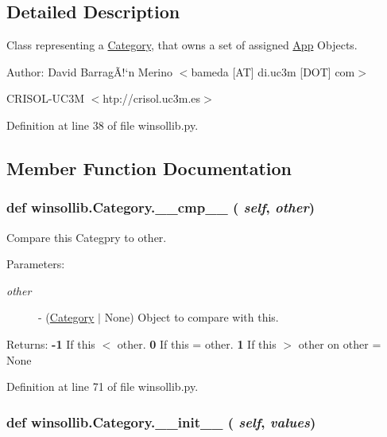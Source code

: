 \subsection{Detailed Description}
Class representing a \hyperlink{classwinsollib_1_1Category}{Category}, that owns a set of assigned \hyperlink{classwinsollib_1_1App}{App} Objects. 

\begin{Desc}
\item[Author:]David Barrag\~{A}!`n Merino $<$bameda \mbox{[}AT\mbox{]} di.uc3m \mbox{[}DOT\mbox{]} com$>$ 

CRISOL-UC3M $<$htp://crisol.uc3m.es$>$ \end{Desc}




Definition at line 38 of file winsollib.py.

\subsection{Member Function Documentation}
\hypertarget{classwinsollib_1_1Category_6f1f13764c35d89518361b6f9fb951d5}{
\subsubsection[\_\-\_\-cmp\_\-\_\-]{\setlength{\rightskip}{0pt plus 5cm}def winsollib.Category.\_\-\_\-cmp\_\-\_\- ( {\em self},  {\em other})}}
\label{classwinsollib_1_1Category_6f1f13764c35d89518361b6f9fb951d5}


Compare this Categpry to other. 

\begin{Desc}
\item[Parameters:]
\begin{description}
\item[{\em other}]- (\hyperlink{classwinsollib_1_1Category}{Category} $|$ None) Object to compare with this. \end{description}
\end{Desc}
\begin{Desc}
\item[Returns:]{\bf -1} If this $<$ other. {\bf 0} If this = other. {\bf 1} If this $>$ other on other = None \end{Desc}


Definition at line 71 of file winsollib.py.\hypertarget{classwinsollib_1_1Category_daae86f216d79ec0328c01945a0a18d6}{
\subsubsection[\_\-\_\-init\_\-\_\-]{\setlength{\rightskip}{0pt plus 5cm}def winsollib.Category.\_\-\_\-init\_\-\_\- ( {\em self},  {\em values})}}
\label{classwinsollib_1_1Category_daae86f216d79ec0328c01945a0a18d6}


